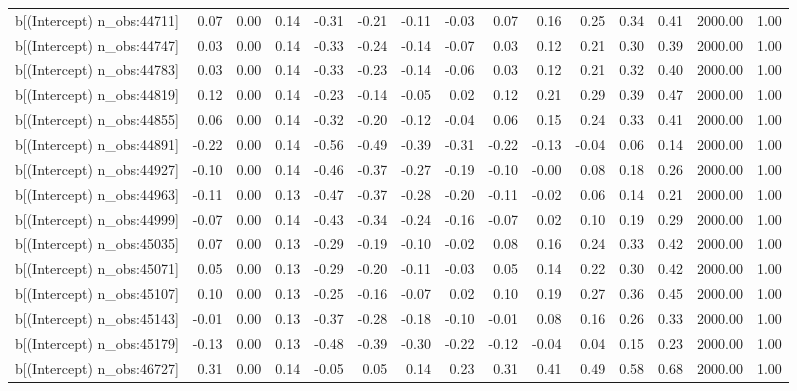 \begin{table}[ht]
\begin{tabular}{rrrrrrrrrrrrrrr}
  b[(Intercept) n\_obs:44711] & 0.07 & 0.00 & 0.14 & -0.31 & -0.21 & -0.11 & -0.03 & 0.07 & 0.16 & 0.25 & 0.34 & 0.41 & 2000.00 & 1.00 \\ 
  b[(Intercept) n\_obs:44747] & 0.03 & 0.00 & 0.14 & -0.33 & -0.24 & -0.14 & -0.07 & 0.03 & 0.12 & 0.21 & 0.30 & 0.39 & 2000.00 & 1.00 \\ 
  b[(Intercept) n\_obs:44783] & 0.03 & 0.00 & 0.14 & -0.33 & -0.23 & -0.14 & -0.06 & 0.03 & 0.12 & 0.21 & 0.32 & 0.40 & 2000.00 & 1.00 \\ 
  b[(Intercept) n\_obs:44819] & 0.12 & 0.00 & 0.14 & -0.23 & -0.14 & -0.05 & 0.02 & 0.12 & 0.21 & 0.29 & 0.39 & 0.47 & 2000.00 & 1.00 \\ 
  b[(Intercept) n\_obs:44855] & 0.06 & 0.00 & 0.14 & -0.32 & -0.20 & -0.12 & -0.04 & 0.06 & 0.15 & 0.24 & 0.33 & 0.41 & 2000.00 & 1.00 \\ 
  b[(Intercept) n\_obs:44891] & -0.22 & 0.00 & 0.14 & -0.56 & -0.49 & -0.39 & -0.31 & -0.22 & -0.13 & -0.04 & 0.06 & 0.14 & 2000.00 & 1.00 \\ 
  b[(Intercept) n\_obs:44927] & -0.10 & 0.00 & 0.14 & -0.46 & -0.37 & -0.27 & -0.19 & -0.10 & -0.00 & 0.08 & 0.18 & 0.26 & 2000.00 & 1.00 \\ 
  b[(Intercept) n\_obs:44963] & -0.11 & 0.00 & 0.13 & -0.47 & -0.37 & -0.28 & -0.20 & -0.11 & -0.02 & 0.06 & 0.14 & 0.21 & 2000.00 & 1.00 \\ 
  b[(Intercept) n\_obs:44999] & -0.07 & 0.00 & 0.14 & -0.43 & -0.34 & -0.24 & -0.16 & -0.07 & 0.02 & 0.10 & 0.19 & 0.29 & 2000.00 & 1.00 \\ 
  b[(Intercept) n\_obs:45035] & 0.07 & 0.00 & 0.13 & -0.29 & -0.19 & -0.10 & -0.02 & 0.08 & 0.16 & 0.24 & 0.33 & 0.42 & 2000.00 & 1.00 \\ 
  b[(Intercept) n\_obs:45071] & 0.05 & 0.00 & 0.13 & -0.29 & -0.20 & -0.11 & -0.03 & 0.05 & 0.14 & 0.22 & 0.30 & 0.42 & 2000.00 & 1.00 \\ 
  b[(Intercept) n\_obs:45107] & 0.10 & 0.00 & 0.13 & -0.25 & -0.16 & -0.07 & 0.02 & 0.10 & 0.19 & 0.27 & 0.36 & 0.45 & 2000.00 & 1.00 \\ 
  b[(Intercept) n\_obs:45143] & -0.01 & 0.00 & 0.13 & -0.37 & -0.28 & -0.18 & -0.10 & -0.01 & 0.08 & 0.16 & 0.26 & 0.33 & 2000.00 & 1.00 \\ 
  b[(Intercept) n\_obs:45179] & -0.13 & 0.00 & 0.13 & -0.48 & -0.39 & -0.30 & -0.22 & -0.12 & -0.04 & 0.04 & 0.15 & 0.23 & 2000.00 & 1.00 \\ 
  b[(Intercept) n\_obs:46727] & 0.31 & 0.00 & 0.14 & -0.05 & 0.05 & 0.14 & 0.23 & 0.31 & 0.41 & 0.49 & 0.58 & 0.68 & 2000.00 & 1.00 \\ 

\end{tabular}
\end{table}
